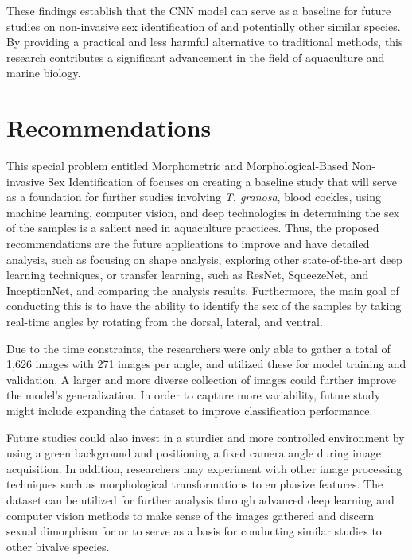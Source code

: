 These findings establish that the CNN model can serve as a baseline for future studies on non-invasive sex identification of \Tgranosa and potentially other similar species. By providing a practical and less harmful alternative to traditional methods, this research contributes a significant advancement in the field of aquaculture and marine biology.

\section{Recommendations}

This special problem entitled Morphometric and Morphological-Based Non-invasive Sex Identification of \Tgranosa focuses on creating a baseline study that will serve as a foundation for further studies involving \textit{T. granosa}, blood cockles, using machine learning, computer vision, and deep technologies in determining the sex of the samples is a salient need in aquaculture practices. Thus, the proposed recommendations are the future applications to improve and have detailed analysis, such as focusing on shape analysis, exploring other state-of-the-art deep learning techniques, or transfer learning, such as ResNet, SqueezeNet, and InceptionNet, and comparing the analysis results. Furthermore, the main goal of conducting this is to have the ability to identify the sex of the samples by taking real-time angles by rotating from the dorsal, lateral, and ventral.

Due to the time constraints, the researchers were only able to gather a total of 1,626 images with 271 images per angle, and utilized these for model training and validation. A larger and more diverse collection of images could further improve the model’s generalization. In order to capture more variability, future study might include expanding the dataset to improve classification performance. 

Future studies could also invest in a  sturdier and more controlled environment by using a green background and positioning a fixed camera angle during image acquisition. In addition, researchers may experiment with other image processing techniques such as morphological transformations to emphasize features. The dataset can be utilized for further analysis through advanced deep learning and computer vision methods to make sense of the images gathered and discern sexual dimorphism for \Tgranosa or to serve as a basis for conducting similar studies to other bivalve species. 
